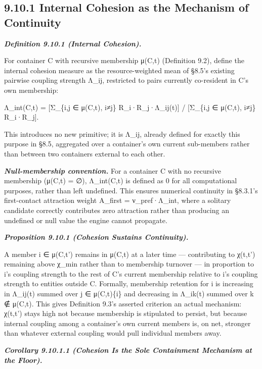 \documentclass[
]{article}
\begin{document}
\hypertarget{internal-cohesion-as-the-mechanism-of-continuity}{%
\subsection{9.10.1 Internal Cohesion as the Mechanism of
Continuity}\label{internal-cohesion-as-the-mechanism-of-continuity}}

\emph{\textbf{Definition 9.10.1 (Internal Cohesion).}}

For container C with recursive membership μ(C,t) (Definition 9.2),
define the internal cohesion measure as the resource-weighted mean of
§8.5's existing pairwise coupling strength Λ\_ij, restricted to pairs
currently co-resident in C's own membership:

Λ\_int(C,t) = {[}Σ\_\{i,j ∈ μ(C,t), i≠j\} R\_i·R\_j·Λ\_ij(t){]} /
{[}Σ\_\{i,j ∈ μ(C,t), i≠j\} R\_i·R\_j{]}.

This introduces no new primitive; it is Λ\_ij, already defined for
exactly this purpose in §8.5, aggregated over a container's own current
sub-members rather than between two containers external to each other.

\emph{\textbf{Null-membership convention.}} For a container C with no
recursive membership (μ(C,t) = ∅), Λ\_int(C,t) is defined as 0 for all
computational purposes, rather than left undefined. This ensures
numerical continuity in §8.3.1's first-contact attraction weight
A\_first = ν\_pref·Λ\_int, where a solitary candidate correctly
contributes zero attraction rather than producing an undefined or null
value the engine cannot propagate.

\emph{\textbf{Proposition 9.10.1 (Cohesion Sustains Continuity).}}

A member i ∈ μ(C,t') remains in μ(C,t) at a later time --- contributing
to χ(t,t') remaining above χ\_min rather than to membership turnover ---
in proportion to i's coupling strength to the rest of C's current
membership relative to i's coupling strength to entities outside C.
Formally, membership retention for i is increasing in Λ\_ij(t) summed
over j ∈ μ(C,t)\{i\} and decreasing in Λ\_ik(t) summed over k ∉ μ(C,t).
This gives Definition 9.3's asserted criterion an actual mechanism:
χ(t,t') stays high not because membership is stipulated to persist, but
because internal coupling among a container's own current members is, on
net, stronger than whatever external coupling would pull individual
members away.

\emph{\textbf{Corollary 9.10.1.1 (Cohesion Is the Sole Containment
Mechanism at the Floor).}}
\end{document}
